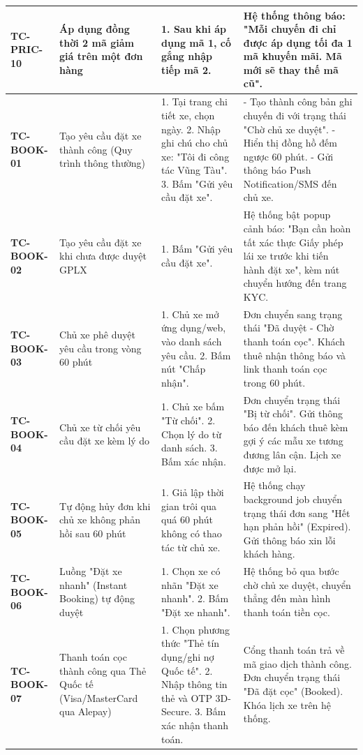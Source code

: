 {\begin{longtable}{p{2.3cm}p{3.8cm}p{4.8cm}p{4.2cm}}
\textbf{TC-PRIC-10} & Áp dụng đồng thời 2 mã giảm giá trên một đơn hàng & 1. Sau khi áp dụng mã 1, cố gắng nhập tiếp mã 2. & Hệ thống thông báo: "Mỗi chuyến đi chỉ được áp dụng tối đa 1 mã khuyến mãi. Mã mới sẽ thay thế mã cũ". \\ \midrule
\textbf{TC-BOOK-01} & Tạo yêu cầu đặt xe thành công (Quy trình thông thường) & 1. Tại trang chi tiết xe, chọn ngày. 2. Nhập ghi chú cho chủ xe: "Tôi đi công tác Vũng Tàu". 3. Bấm "Gửi yêu cầu đặt xe". & - Tạo thành công bản ghi chuyến đi với trạng thái "Chờ chủ xe duyệt". - Hiển thị đồng hồ đếm ngược 60 phút. - Gửi thông báo Push Notification/SMS đến chủ xe. \\ \midrule
\textbf{TC-BOOK-02} & Tạo yêu cầu đặt xe khi chưa được duyệt GPLX & 1. Bấm "Gửi yêu cầu đặt xe". & Hệ thống bật popup cảnh báo: "Bạn cần hoàn tất xác thực Giấy phép lái xe trước khi tiến hành đặt xe", kèm nút chuyển hướng đến trang KYC. \\ \midrule
\textbf{TC-BOOK-03} & Chủ xe phê duyệt yêu cầu trong vòng 60 phút & 1. Chủ xe mở ứng dụng/web, vào danh sách yêu cầu. 2. Bấm nút "Chấp nhận". & Đơn chuyển sang trạng thái "Đã duyệt - Chờ thanh toán cọc". Khách thuê nhận thông báo và link thanh toán cọc trong 60 phút. \\ \midrule
\textbf{TC-BOOK-04} & Chủ xe từ chối yêu cầu đặt xe kèm lý do & 1. Chủ xe bấm "Từ chối". 2. Chọn lý do từ danh sách. 3. Bấm xác nhận. & Đơn chuyển trạng thái "Bị từ chối". Gửi thông báo đến khách thuê kèm gợi ý các mẫu xe tương đương lân cận. Lịch xe được mở lại. \\ \midrule
\textbf{TC-BOOK-05} & Tự động hủy đơn khi chủ xe không phản hồi sau 60 phút & 1. Giả lập thời gian trôi qua quá 60 phút không có thao tác từ chủ xe. & Hệ thống chạy background job chuyển trạng thái đơn sang "Hết hạn phản hồi" (Expired). Gửi thông báo xin lỗi khách hàng. \\ \midrule
\textbf{TC-BOOK-06} & Luồng "Đặt xe nhanh" (Instant Booking) tự động duyệt & 1. Chọn xe có nhãn "Đặt xe nhanh". 2. Bấm "Đặt xe nhanh". & Hệ thống bỏ qua bước chờ chủ xe duyệt, chuyển thẳng đến màn hình thanh toán tiền cọc. \\ \midrule
\textbf{TC-BOOK-07} & Thanh toán cọc thành công qua Thẻ Quốc tế (Visa/MasterCard qua Alepay) & 1. Chọn phương thức "Thẻ tín dụng/ghi nợ Quốc tế". 2. Nhập thông tin thẻ và OTP 3D-Secure. 3. Bấm xác nhận thanh toán. & Cổng thanh toán trả về mã giao dịch thành công. Đơn chuyển trạng thái "Đã đặt cọc" (Booked). Khóa lịch xe trên hệ thống. \\ \midrule

\end{longtable}}
